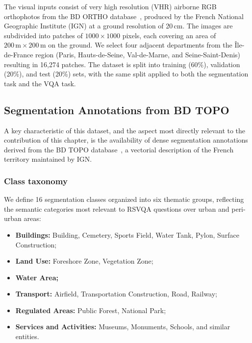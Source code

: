 The visual inputs consist of very high resolution (VHR)
airborne RGB orthophotos from the BD ORTHO
database~\cite{bdortho}, produced by the French National
Geographic Institute (IGN) at a ground resolution of 20\,cm.
The images are subdivided into patches of
$1000 \times 1000$ pixels, each covering an area of
$200\,\text{m} \times 200\,\text{m}$ on the ground. We
select four adjacent departments from the Île-de-France
region (Paris, Hauts-de-Seine, Val-de-Marne, and
Seine-Saint-Denis) resulting in 16,274 patches. The
dataset is split into training (60\%), validation (20\%),
and test (20\%) sets, with the same split applied to both
the segmentation task and the VQA task.

\subsection{Segmentation Annotations from BD TOPO}
\label{sec:chap4_dataset_seg}

A key characteristic of this dataset, and the aspect most
directly relevant to the contribution of this chapter, is
the availability of dense segmentation annotations derived
from the BD TOPO database~\cite{bdtopo}, a vectorial
description of the French territory maintained by IGN.

\subsubsection{Class taxonomy}
\label{sec:chap4_seg_classes}

We define 16 segmentation classes organized into six
thematic groups, reflecting the semantic categories most
relevant to RSVQA questions over urban and peri-urban
areas:

\begin{itemize}
    \item \textbf{Buildings:} Building, Cemetery, Sports
    Field, Water Tank, Pylon, Surface Construction;
    \item \textbf{Land Use:} Foreshore Zone, Vegetation
    Zone;
    \item \textbf{Water Area;}
    \item \textbf{Transport:} Airfield, Transportation
    Construction, Road, Railway;
    \item \textbf{Regulated Areas:} Public Forest,
    National Park;
    \item \textbf{Services and Activities:} Museums,
    Monuments, Schools, and similar entities.
\end{itemize}

